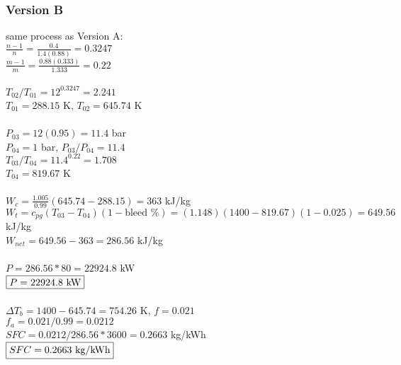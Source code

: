 \documentclass{article}
\begin{document}
\subsubsection*{Version B}
same process as Version A: \\
$\frac{n-1}{n}=\frac{0.4}{1.4(0.88)}=0.3247$ \\
$\frac{m-1}{m}=\frac{0.88(0.333)}{1.333}=0.22$ \\\\
$T_{02}/T_{01}=12^{0.3247}=2.241$ \\
$T_{01}=288.15$ K, $T_{02}=645.74$ K \\\\
$P_{03}=12(0.95)=11.4$ bar \\
$P_{04}=1$ bar, $P_{03}/P_{04}=11.4$ \\
$T_{03}/T_{04}=11.4^{0.22}=1.708$ \\
$T_{04}=819.67$ K \\\\
$W_c=\frac{1.005}{0.99}(645.74-288.15)=363$ kJ/kg \\
$W_t=c_{pg}(T_{03}-T_{04})(1-\textrm{bleed \%})=(1.148)(1400-819.67)(1-0.025)=
649.56$ kJ/kg \\
$W_{net}=649.56-363=286.56$ kJ/kg \\\\
$P=286.56*80=22924.8$ kW \\
$\fbox{$P=22924.8$ kW}$ \\\\
$\Delta T_b=1400-645.74=754.26$ K, $f=0.021$ \\
$f_a=0.021/0.99=0.0212$ \\
$SFC=0.0212/286.56*3600=0.2663$ kg/kWh \\
$\fbox{$SFC=0.2663$ kg/kWh}$
\end{document}
